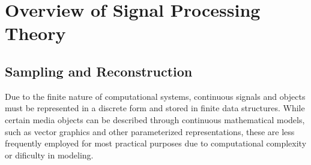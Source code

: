 







\section{Overview of Signal Processing Theory}

\subsection{Sampling and Reconstruction}

Due to the finite nature of computational systems, continuous signals and objects must be represented in a discrete form and stored in finite data structures. While certain media objects can be described through continuous mathematical models, such as vector graphics and other parameterized representations, these are less frequently employed for most practical purposes due to computational complexity or dificulty in modeling.

